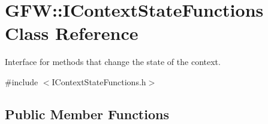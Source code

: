 \hypertarget{class_g_f_w_1_1_i_context_state_functions}{}\section{G\+FW\+:\+:I\+Context\+State\+Functions Class Reference}
\label{class_g_f_w_1_1_i_context_state_functions}


Interface for methods that change the state of the context.  




{\ttfamily \#include $<$I\+Context\+State\+Functions.\+h$>$}

\subsection*{Public Member Functions}
